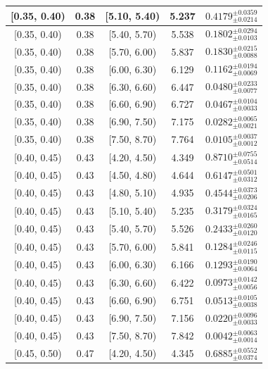 \begin{longtable}{|c|c|c|c|c|}
\hline
[0.35, 0.40) & 0.38 & [5.10, 5.40) & 5.237 & $0.4179^{ \pm 0.0359 }_{ \pm 0.0214 }$ \\ 
\hline
[0.35, 0.40) & 0.38 & [5.40, 5.70) & 5.538 & $0.1802^{ \pm 0.0294 }_{ \pm 0.0103 }$ \\ 
\hline
[0.35, 0.40) & 0.38 & [5.70, 6.00) & 5.837 & $0.1830^{ \pm 0.0215 }_{ \pm 0.0088 }$ \\ 
\hline
[0.35, 0.40) & 0.38 & [6.00, 6.30) & 6.129 & $0.1162^{ \pm 0.0194 }_{ \pm 0.0069 }$ \\ 
\hline
[0.35, 0.40) & 0.38 & [6.30, 6.60) & 6.447 & $0.0480^{ \pm 0.0233 }_{ \pm 0.0077 }$ \\ 
\hline
[0.35, 0.40) & 0.38 & [6.60, 6.90) & 6.727 & $0.0467^{ \pm 0.0104 }_{ \pm 0.0033 }$ \\ 
\hline
[0.35, 0.40) & 0.38 & [6.90, 7.50) & 7.175 & $0.0282^{ \pm 0.0065 }_{ \pm 0.0021 }$ \\ 
\hline
[0.35, 0.40) & 0.38 & [7.50, 8.70) & 7.764 & $0.0105^{ \pm 0.0037 }_{ \pm 0.0012 }$ \\ 
\hline
[0.40, 0.45) & 0.43 & [4.20, 4.50) & 4.349 & $0.8710^{ \pm 0.0755 }_{ \pm 0.0514 }$ \\ 
\hline
[0.40, 0.45) & 0.43 & [4.50, 4.80) & 4.644 & $0.6147^{ \pm 0.0501 }_{ \pm 0.0312 }$ \\ 
\hline
[0.40, 0.45) & 0.43 & [4.80, 5.10) & 4.935 & $0.4544^{ \pm 0.0373 }_{ \pm 0.0206 }$ \\ 
\hline
[0.40, 0.45) & 0.43 & [5.10, 5.40) & 5.235 & $0.3179^{ \pm 0.0324 }_{ \pm 0.0165 }$ \\ 
\hline
[0.40, 0.45) & 0.43 & [5.40, 5.70) & 5.526 & $0.2433^{ \pm 0.0260 }_{ \pm 0.0120 }$ \\ 
\hline
[0.40, 0.45) & 0.43 & [5.70, 6.00) & 5.841 & $0.1284^{ \pm 0.0246 }_{ \pm 0.0115 }$ \\ 
\hline
[0.40, 0.45) & 0.43 & [6.00, 6.30) & 6.166 & $0.1293^{ \pm 0.0190 }_{ \pm 0.0064 }$ \\ 
\hline
[0.40, 0.45) & 0.43 & [6.30, 6.60) & 6.422 & $0.0973^{ \pm 0.0142 }_{ \pm 0.0056 }$ \\ 
\hline
[0.40, 0.45) & 0.43 & [6.60, 6.90) & 6.751 & $0.0513^{ \pm 0.0105 }_{ \pm 0.0038 }$ \\ 
\hline
[0.40, 0.45) & 0.43 & [6.90, 7.50) & 7.156 & $0.0220^{ \pm 0.0096 }_{ \pm 0.0033 }$ \\ 
\hline
[0.40, 0.45) & 0.43 & [7.50, 8.70) & 7.842 & $0.0042^{ \pm 0.0063 }_{ \pm 0.0014 }$ \\ 
\hline
[0.45, 0.50) & 0.47 & [4.20, 4.50) & 4.345 & $0.6885^{ \pm 0.0552 }_{ \pm 0.0374 }$ \\ 

\end{longtable}
